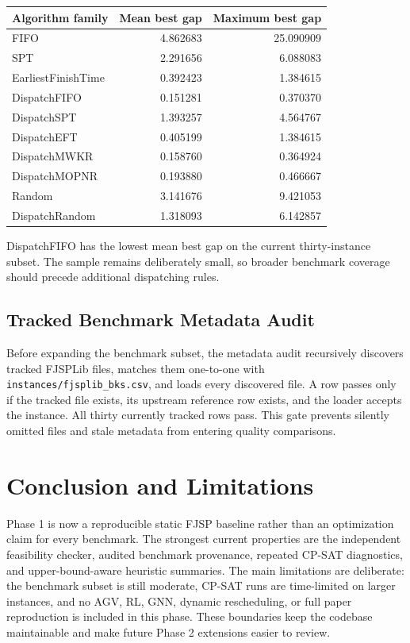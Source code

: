 ﻿\documentclass[11pt]{article}
\begin{document}
\begin{table}[h]
\centering
\begin{tabular}{lrr}
\toprule
Algorithm family & Mean best gap & Maximum best gap \\
\midrule
FIFO & 4.862683 & 25.090909 \\
SPT & 2.291656 & 6.088083 \\
EarliestFinishTime & 0.392423 & 1.384615 \\
DispatchFIFO & 0.151281 & 0.370370 \\
DispatchSPT & 1.393257 & 4.564767 \\
DispatchEFT & 0.405199 & 1.384615 \\
DispatchMWKR & 0.158760 & 0.364924 \\
DispatchMOPNR & 0.193880 & 0.466667 \\
Random & 3.141676 & 9.421053 \\
DispatchRandom & 1.318093 & 6.142857 \\
\bottomrule
\end{tabular}
\end{table}

DispatchFIFO has the lowest mean best gap on the current thirty-instance subset.
The sample remains deliberately small, so broader benchmark coverage should
precede additional dispatching rules.

\clearpage
\subsection{Tracked Benchmark Metadata Audit}

Before expanding the benchmark subset, the metadata audit recursively
discovers tracked FJSPLib files, matches them one-to-one with
\texttt{instances/fjsplib\_bks.csv}, and loads every discovered file. A row
passes only if the tracked file exists, its upstream reference row exists, and
the loader accepts the instance. All thirty currently tracked rows pass. This
gate prevents silently omitted files and stale metadata from entering quality
comparisons.

\section{Conclusion and Limitations}

Phase 1 is now a reproducible static FJSP baseline rather than an optimization
claim for every benchmark. The strongest current properties are the independent
feasibility checker, audited benchmark provenance, repeated CP-SAT diagnostics,
and upper-bound-aware heuristic summaries. The main limitations are deliberate: the
benchmark subset is still moderate, CP-SAT runs are time-limited on larger
instances, and no AGV, RL, GNN, dynamic rescheduling, or full paper reproduction
is included in this phase. These boundaries keep the codebase maintainable and
make future Phase 2 extensions easier to review.
\end{document}
